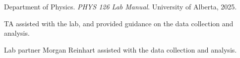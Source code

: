 \documentclass[12pt]{article}
\begin{document}
\begin{thebibliography}{9}

    Department of Physics. \textit{PHYS 126 Lab Manual}. University of Alberta, 2025.

    TA assisted with the lab, and provided guidance on the data collection and analysis.

    Lab partner Morgan Reinhart assisted with the data collection and analysis.
    
    \end{thebibliography}
\end{document}

